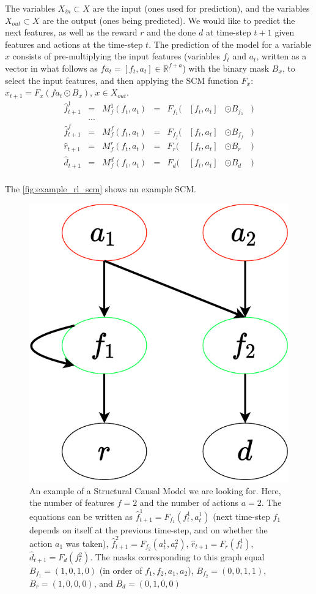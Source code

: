\documentclass[a4paper,11pt,oneside]{report}
\begin{document}
The variables $X_{in}\subset X$ are the input (ones used for prediction), and the variables $X_{out}\subset X$ are the output (ones being predicted).
We would like to predict the next features, as well as the reward $r$ and the done $d$ at time-step $t+1$ given features and actions at the time-step $t$. The prediction of the model for a variable $x$ consists of pre-multiplying the input features (variables $f_t$ and $a_t$, written as a vector in what follows as $fa_t=[f_t,a_t]\in\mathbb R^{f+a}$) with the binary mask $B_x$, to select the input features, and then applying the SCM function $F_x$: $x_{t+1}=F_x(fa_t\odot B_x)$, $x\in X_{out}$.
$$
\begin{array}{lcllrllr}
\hat{f}_{t+1}^1&=&M_f^1(f_t,a_t)&=&F_{f_1}(&[f_t,a_t]&\odot B_{f_1}&)\\
&...&\\
\hat{f}_{t+1}^f&=&M_f^f(f_t,a_t)&=&F_{f_f}(&[f_t,a_t]&\odot B_{f_f}&)\\
\hat{r}_{t+1}&=&M_f^r(f_t,a_t)&=&F_{r}(&[f_t,a_t]&\odot B_{r}&)\\
\hat{d}_{t+1}&=&M_f^d(f_t,a_t)&=&F_{d}(&[f_t,a_t]&\odot B_{d}&)\\
\end{array}
$$

The \autoref{fig:example_rl_scm} shows an example SCM.

\begin{figure}
    \centering
    \includegraphics[width=0.3\linewidth]{diagrams/example_rl_scm}
    \caption{An example of a Structural Causal Model we are looking for. Here, the number of features $f=2$ and the number of actions $a=2$. The equations can be written as $\hat{f}^1_{t+1}=F_{f_1}(f^1_t,a^1_t)$ (next time-step $f_1$ depends on itself at the previous time-step, and on whether the action $a_1$ was taken), $\hat{f}^2_{t+1}=F_{f_2}(a_t^1,a_t^2)$, $\hat{r}_{t+1}=F_r(f_t^1)$, $\hat{d}_{t+1}=F_d(f^2_t)$. The masks corresponding to this graph equal $B_{f_1}=(1,0,1,0)$ (in order of $f_1,f_2,a_1,a_2$), $B_{f_2}=(0,0,1,1)$, $B_r=(1,0,0,0)$, and $B_d=(0,1,0,0)$}
    \label{fig:example_rl_scm}
\end{figure}
\end{document}

